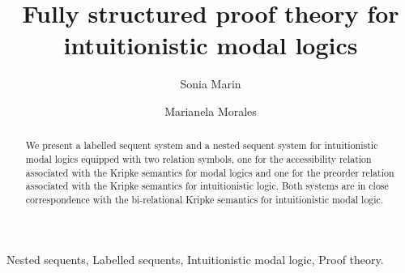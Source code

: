 \documentclass[twoside]{aiml20}
\begin{document}
\begin{frontmatter}
  \title{Fully structured proof theory for intuitionistic modal logics}
  \author{Sonia Marin}
  \address{University College London, UK}
  \author{Marianela Morales}
  \address{LIX, \'Ecole Polytechnique  \&  Inria Saclay, France}
  
  \begin{abstract}
  We present a labelled sequent system and a nested sequent system for intuitionistic modal logics equipped with two relation symbols, one for the accessibility relation associated with the Kripke semantics for modal logics and one for the preorder relation associated with the Kripke semantics for intuitionistic logic. Both systems are in close correspondence with the bi-relational Kripke semantics for intuitionistic modal logic.
  \end{abstract}

  \begin{keyword}
  Nested sequents, Labelled sequents, Intuitionistic modal logic, Proof theory.
  \end{keyword}
 \end{frontmatter}

%
%
%
%
\end{document}
